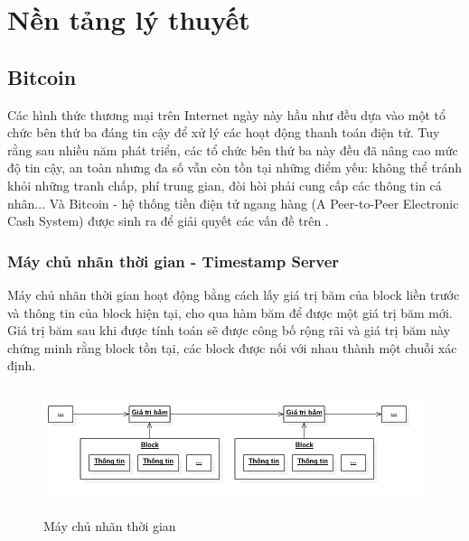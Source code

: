\chapter{Nền tảng lý thuyết}
\section{Bitcoin}
Các hình thức thương mại trên Internet ngày này hầu như đều dựa vào một tổ chức 
bên thứ ba đáng tin cậy để xử lý các hoạt động thanh toán điện tử. Tuy rằng sau 
nhiều năm phát triển, các tổ chức bên thứ ba này đều đã nâng cao mức độ tin cậy, 
an toàn nhưng đa số vẫn còn tồn tại những điểm yếu: không thể tránh khỏi những 
tranh chấp, phí trung gian, đòi hòi phải cung cấp các thông tin cá nhân... Và 
Bitcoin - hệ thống tiền điện tử ngang hàng (A Peer-to-Peer Electronic Cash System) 
được sinh ra để giải quyết các vấn đề trên \cite{BitcoinPaper}.
\subsection{Máy chủ nhãn thời gian - Timestamp Server}
Máy chủ nhãn thời gian hoạt động bằng cách lấy giá trị băm của block liền trước 
và thông tin của block hiện tại, cho qua hàm băm để được một giá trị băm mới. 
Giá trị băm sau khi được tính toán sẽ được công bố rộng rãi và giá trị băm này 
chứng minh rằng block tồn tại, các block được nối với nhau thành một chuỗi xác 
định.\\
\begin{figure}[h!]
\centering
\includegraphics[height=1.45in, keepaspectratio=true]{timestampserver.png}
\caption{Máy chủ nhãn thời gian}
\end{figure}\\
